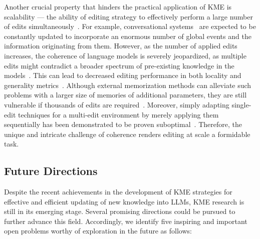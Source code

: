 \documentclass[acmsmall, screen]{acmart}
\begin{document}
Another crucial property that hinders the practical application of KME is scalability — the ability of editing strategy to effectively perform a large number of edits simultaneously~\cite{mitchell2022fast}. For example, conversational systems~\cite{IKE} are expected to be constantly updated to incorporate an enormous number of global events and the information originating from them. However, as the number of applied edits increases, the coherence of language models is severely jeopardized, as multiple edits might contradict a broader spectrum of pre-existing knowledge in the models~\cite{wang2023easyedit}. This can lead to decreased editing performance in both locality and generality metrics~\cite{SERAC}. Although external memorization methods can alleviate such problems with a larger size of memories of additional parameters, they are still vulnerable if thousands of edits are required~\cite{meng2022locating}. Moreover, simply adapting single-edit techniques for a multi-edit environment by merely applying them sequentially has been demonstrated to be proven suboptimal~\cite{meng2023mass}. Therefore, the unique and intricate challenge of coherence renders editing at scale a formidable task.


\subsection{Future Directions}
Despite the recent achievements in the development of KME strategies for effective and efficient updating of new knowledge into LLMs, KME research is still in its emerging stage. Several promising directions could be pursued to further advance this field. Accordingly, we identify five inspiring and important open problems worthy of exploration in the future as follows:
\end{document}
